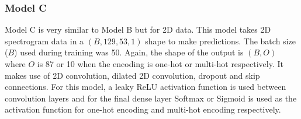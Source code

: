 \documentclass[12pt]{article}
\begin{document}
    \subsubsection{Model C}
    \label{sec:design_modelC}
    
    Model C is very similar to Model B but for 2D data. This model takes 2D spectrogram data in a $(B, 129, 53, 1)$ shape to make predictions. The batch size ($B$) used during training was 50. Again, the shape of the output is $(B, O)$ where $O$ is 87 or 10 when the encoding is one-hot or multi-hot respectively. It makes use of 2D convolution, dilated 2D convolution, dropout and skip connections. For this model, a leaky ReLU activation function is used between convolution layers and for the final dense layer Softmax or Sigmoid is used as the activation function for one-hot encoding and multi-hot encoding respectively.\medskip
\end{document}
